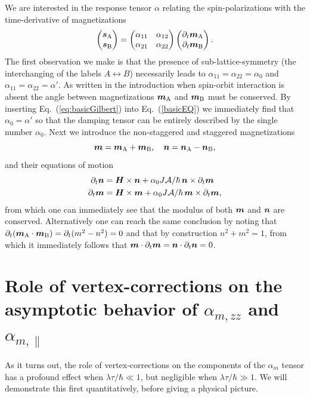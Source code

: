We are interested in the response tensor $\alpha$ relating the spin-polarizations with the time-derivative of magnetizations
\begin{equation}
\label{eq:basicGilbert}
    \begin{pmatrix}
    \boldsymbol{s}_\text{A} \\ \boldsymbol{s}_\text{B}
    \end{pmatrix}
    =
    \begin{pmatrix}
    \alpha_{11} & \alpha_{12} \\ \alpha_{21} & \alpha_{22}
    \end{pmatrix}
    \begin{pmatrix}
    \partial_t \boldsymbol{m}_\text{A} \\ \partial_t\boldsymbol{m}_\text{B}
    \end{pmatrix}.
\end{equation}
The first observation we make is that the presence of sub-lattice-symmetry (the interchanging of the labels $A\leftrightarrow B$) necessarily leads to $\alpha_{11}=\alpha_{22}=\alpha_0$ and $\alpha_{11}=\alpha_{22}=\alpha'$. As written in the introduction when spin-orbit interaction is absent the angle between magnetizations $\boldsymbol{m}_\text{A}$ and $\boldsymbol{m}_\text{B}$ must be conserved. By inserting Eq.~(\ref{eq:basicGilbert}) into Eq.~(\ref{basicEQ}) we immediately find that $\alpha_0=\alpha'$ so that the damping tensor can be entirely described by the single number $\alpha_0$. Next we introduce the non-staggered and staggered magnetizations 
\begin{equation}
    \boldsymbol{m} = \boldsymbol{m}_\text{A} + \boldsymbol{m}_\text{B}, \quad \boldsymbol{n} = \boldsymbol{n}_\text{A} - \boldsymbol{n}_\text{B},
\end{equation}
and their equations of motion
\begin{align}
    \partial_t{\boldsymbol{n}}  &= \boldsymbol{H}\times\boldsymbol{n}  + \alpha_0 J\mathcal{A}/\hbar\,\boldsymbol{n}\times \partial_t\boldsymbol{m}\\
    \partial_t{\boldsymbol{m}}  &= \boldsymbol{H}\times\boldsymbol{m}  + \alpha_0 J\mathcal{A}/\hbar\,\boldsymbol{m}\times \partial_t\boldsymbol{m},
\end{align}
from which one can immediately see that the modulus of both $\boldsymbol{m}$ and $\boldsymbol{n}$ are conserved. Alternatively one can reach the same conclusion by noting that $\partial_t (\boldsymbol{m}_\text{A}\cdot\boldsymbol{m}_\text{B}) = \partial_t (m^2-n^2) = 0$ and that by construction $n^2+m^2=1$, from which it immediately follows that $\boldsymbol{m}\cdot\partial_t\boldsymbol{m} = \boldsymbol{n}\cdot\partial_t\boldsymbol{n} = 0$. 


\section{Role of vertex-corrections on the asymptotic behavior of $\alpha_{m,zz}$ and $\alpha_{m,\parallel}$}
As it turns out, the role of vertex-corrections on the components of the $\alpha_m$ tensor has a profound effect when $\lambda\tau/\hbar\ll1$, but negligible when $\lambda\tau/\hbar\gg1$. We will demonstrate this first quantitatively, before giving a physical picture. 

